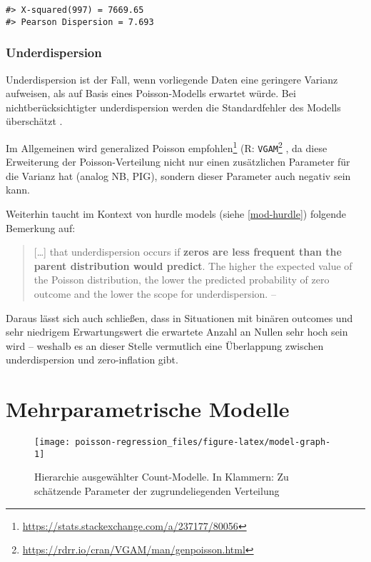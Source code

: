 \documentclass[ngerman,a4paper,]{scrartcl}
\renewcommand{\href}[2]{#2\footnote{\url{#1}}}
\let\rmarkdownfootnote\footnote%
\def\footnote{\protect\rmarkdownfootnote}
\theoremstyle{definition}
\theoremstyle{definition}
\theoremstyle{definition}
\theoremstyle{remark}
\begin{document}
\begin{verbatim}
#> X-squared(997) = 7669.65
#> Pearson Dispersion = 7.693
\end{verbatim}

\hypertarget{underdispersion}{%
\subsubsection{Underdispersion}\label{underdispersion}}

Underdispersion ist der Fall, wenn vorliegende Daten eine geringere Varianz aufweisen, als auf Basis eines Poisson-Modells erwartet würde.
Bei nichtberücksichtigter underdispersion werden die Standardfehler des Modells überschätzt \citep[p.~210]{hilbeModelingCountData2014}.

Im Allgemeinen wird \href{https://stats.stackexchange.com/a/237177/80056}{generalized Poisson empfohlen} (R: \href{https://rdrr.io/cran/VGAM/man/genpoisson.html}{\texttt{VGAM}} \citep{hilbeModelingCountData2014}, da diese Erweiterung der Poisson-Verteilung nicht nur einen zusätzlichen Parameter für die Varianz hat (analog NB, PIG), sondern dieser Parameter auch negativ sein kann.

Weiterhin taucht im Kontext von hurdle models (siehe \ref{mod-hurdle}) folgende Bemerkung auf:

\begin{quote}
{[}\ldots{}{]} that underdispersion occurs if \textbf{zeros are less frequent than the parent distribution would predict}.
The higher the expected value of the Poisson distribution, the lower the predicted probability of zero outcome and the lower the scope for underdispersion.
-- \citep[p.~180 (eigene Hervorhebung)]{winkelmannEconometricAnalysisCount2010}
\end{quote}

Daraus lässt sich auch schließen, dass in Situationen mit binären outcomes und sehr niedrigem Erwartungswert die erwartete Anzahl an Nullen sehr hoch sein wird -- weshalb es an dieser Stelle vermutlich eine Überlappung zwischen underdispersion und zero-inflation gibt.

\hypertarget{multiparam}{%
\section{Mehrparametrische Modelle}\label{multiparam}}

\begin{figure}

{\centering \texttt{[image: poisson-regression\_files/figure-latex/model-graph-1]} 

}

\caption{Hierarchie ausgewählter Count-Modelle. In Klammern: Zu schätzende Parameter der zugrundeliegenden Verteilung}\label{fig:model-graph}
\end{figure}
\end{document}
